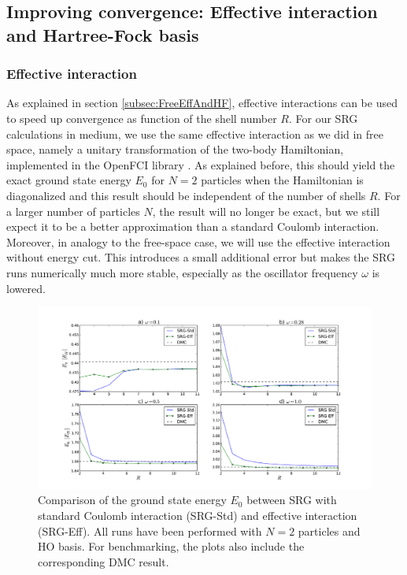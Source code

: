 \subsection{Improving convergence: Effective interaction and Hartree-Fock basis}
\label{subsec:WegnerEffHF}

\subsubsection{Effective interaction}
As explained in section \ref{subsec:FreeEffAndHF}, effective interactions can be used to speed up  convergence as function of the shell number $R$. For our SRG calculations in medium, we use the same effective interaction as we did in free space, namely a unitary transformation of the two-body Hamiltonian, implemented in the OpenFCI library \cite{Kvaalcode}. As explained before, this should yield the exact ground state energy $E_0$ for  $N=2$ particles when the Hamiltonian is diagonalized and this result should be independent of the number of shells $R$. For a larger number of particles $N$, the result will no longer be exact, but we still expect it to be a better approximation than a standard Coulomb interaction. \\
Moreover, in analogy to the free-space case, we will use the effective interaction without energy cut. This introduces a small additional error but makes the SRG runs numerically much more stable, especially as the oscillator frequency $\omega$ is lowered.

\begin{figure}
\begin{center}
\includegraphics[scale=0.4]{../Plots/convergence01.pdf}
\end{center}
\caption{Comparison of the ground state energy $E_0$ between SRG with standard Coulomb interaction (SRG-Std) and effective interaction (SRG-Eff). All runs have been performed with $N=2$ particles and HO basis. For benchmarking, the plots also include the corresponding DMC result.}
\label{fig:convergence01}
\end{figure}

